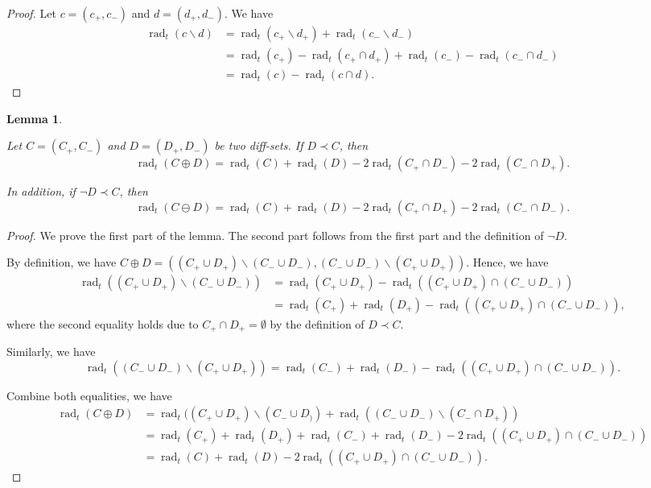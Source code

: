 \documentclass{article}
\newtheorem{lemma}{Lemma}
\newcommand{\diffvalid}{\prec}
\newcommand{\del}{\backslash}
\DeclareMathOperator{\rad}{rad}
\begin{document}
\begin{spacing}{1.1}
\begin{proof}
Let $c=(c_+,c_-)$ and $d=(d_+,d_-)$.
We have
\begin{align*}
\rad_t(c\del d) &= \rad_t(c_+\del d_+)+\rad_t(c_-\del d_-)\\
			    &= \rad_t(c_+)-\rad_t(c_+\cap d_+)+\rad_t(c_-)-\rad_t(c_-\cap d_-)\\
			    &= \rad_t(c)-\rad_t(c\cap d).
\end{align*}

\end{proof}


\begin{lemma}
\label{lemma:diff-algebra-rad}

Let $C=(C_+,C_-)$ and $D=(D_+,D_-)$ be two diff-sets.
If $D \diffvalid C$, then
$$
\rad_t(C \oplus D) = \rad_t(C)+\rad_t(D)-2\rad_t(C_+ \cap D_-)-2\rad_t(C_- \cap D_+).
$$

In addition, if $\neg D \diffvalid C$, then
$$
\rad_t(C \ominus D) = \rad_t(C)+\rad_t(D)-2\rad_t(C_+ \cap D_+)-2\rad_t(C_- \cap D_-).
$$
\end{lemma}

\begin{proof}
We prove the first part of the lemma. The second part follows from the first part and the definition of $\neg D$.

By definition, we have $C\oplus D = ( (C_+ \cup D_+) \del (C_-\cup D_-), (C_-\cup D_-) \del (C_+\cup D_+) )$.
Hence, we have 
\begin{align}
\rad_t((C_+ \cup D_+) \del (C_-\cup D_-)) &= \rad_t(C_+ \cup D_+)-\rad_t( (C_+\cup D_+)\cap(C_-\cup D_-)) \\
							              &= \rad_t(C_+)+\rad_t(D_+)-\rad_t( (C_+\cup D_+)\cap(C_-\cup D_-)),						
\end{align}
where the second equality holds due to $C_+\cap D_+=\emptyset$ by the definition of $D\diffvalid C$.

Similarly, we have
$$
\rad_t((C_- \cup D_-) \del (C_+\cup D_+)) = \rad_t(C_-)+\rad_t(D_-)-\rad_t( (C_+\cup D_+) \cap(C_-\cup D_-)).
$$

Combine both equalities, we have
\begin{align}
  \rad_t(C \oplus D) &= \rad_t((C_+ \cup D_+) \del (C_-\cup D_))+\rad_t((C_- \cup D_-) \del (C_-\cap D_+))\\
  				     &=	\rad_t(C_+)+\rad_t(D_+)+\rad_t(C_-)+\rad_t(D_-)-2\rad_t( (C_+\cup D_+) \cap(C_-\cup D_-))\\
  				     &= \rad_t(C)+\rad_t(D)-2\rad_t( (C_+\cup D_+) \cap(C_-\cup D_-)).
\end{align}



\end{proof}
\end{spacing}
\end{document}
